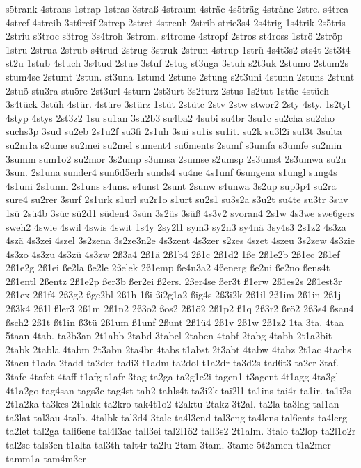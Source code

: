 {s5trank
4strans
1strap
1stras
3straß
4straum
4sträc
4s5träg
4sträne
2stre.
s4trea
4stref
4streib
3st6reif
2strep
2stret
4streuh
2strib
strie3s4
2s4trig
1s4trik
2s5tris
2striu
s3troc
s3trog
3s4troh
3strom.
s4trome
4stropf
2stros
st4ross
1strö
2ströp
1stru
2strua
2strub
s4trud
2strug
3struk
2strun
4strup
1strü
4s4t3s2
sts4t
2st3t4
st2u
1stub
4stuch
3s4tud
2stue
3stuf
2stug
st3uga
3stuh
s2t3uk
2stumo
2stum2s
stum4sc
2stumt
2stun.
st3una
1stund
2stune
2stung
s2t3uni
4stunn
2stuns
2stunt
2stuö
stu3ra
stu5re
2st3url
4sturn
2st3urt
3s2turz
2stus
1s2tut
1stüc
4stüch
3s4tück
3stüh
4stür.
4stüre
3stürz
1stüt
2stütc
2stv
2stw
stwor2
2sty
4sty.
1s2tyl
4styp
4stys
2st3z2
1su
su1an
3su2b3
su4ba2
4subi
su4br
3su1c
su2cha
su2cho
suchs3p
3sud
su2eb
2s1u2f
su3fi
2s1uh
3sui
su1is
su1it.
su2k
su3l2i
sul3t
3sulta
su2m1a
s2ume
su2mei
su2mel
sument4
su6ments
2sumf
s3umfa
s3umfe
su2min
3summ
sum1o2
su2mor
3s2ump
s3umsa
2sumse
s2umsp
2s3umst
2s3umwa
su2n
3sun.
2s1una
sunder4
sun6d5erh
sunds4
su4ne
4s1unf
6sungena
s1ungl
sung4s
4s1uni
2s1unm
2s1uns
s4uns.
s4unst
2sunt
2sunw
s4unwa
3s2up
sup3p4
su2ra
sure4
su2rer
3surf
2s1urk
s1url
su2r1o
s1urt
su2s1
su3s2a
s3u2t
su4te
su3tr
3suv
1sü
2sü4b
3süc
sü2d1
süden4
3sün
3s2üs
3süß
4s3v2
svoran4
2s1w
4s3we
swe6gers
sweh2
4swie
4swil
4swis
4swit
1s4y
2sy2l1
sym3
sy2n3
sy4nä
3sy4s3
2s1z2
4s3za
4szä
4s3zei
4szel
3s2zena
3s2ze3n2e
4s3zent
4s3zer
s2zes
4szet
4szeu
3s2zew
4s3zie
4s3zo
4s3zu
4s3zü
4s3zw
2ß3a4
2ß1ä
2ß1b4
2ß1c
2ß1d2
1ße
2ß1e2b
2ß1ec
2ß1ef
2ß1e2g
2ß1ei
ße2la
ße2le
2ßelek
2ß1emp
ße4n3a2
4ßenerg
ße2ni
ße2no
ßens4t
2ß1entl
2ßentz
2ß1e2p
ßer3b
ßer2ei
ß2ers.
2ßer4se
ßer3t
ß1erw
2ß1es2s
2ß1est3r
2ß1ex
2ß1f4
2ß3g2
ßge2bl
2ß1h
1ßi
ßi2g1a2
ßig4s
2ß3i2k
2ß1il
2ß1im
2ß1in
2ß1j
2ß3k4
2ß1l
ßler3
2ß1m
2ß1n2
2ß3o2
ßos2
2ß1ö2
2ß1p2
ß1q
2ß3r2
ßrö2
2ß3s4
ßsau4
ßsch2
2ß1t
ßt1in
ß3tü
2ß1um
ß1unf
2ßunt
2ß1ü4
2ß1v
2ß1w
2ß1z2
1ta
3ta.
4taa
5taan
4tab.
ta2b3an
2t1abb
2tabd
3tabel
2taben
4tabf
2tabg
4tabh
2t1a2bit
2tabk
2tabla
4tabm
2t3abn
2ta4br
4tabs
t1abst
2t3abt
4tabw
4tabz
2t1ac
4tachs
3tacu
t1ada
2tadd
ta2der
tadi3
t1adm
ta2dol
t1a2dr
ta3d2s
tad6t3
ta2er
3taf.
3tafe
4tafet
4taff
t1afg
t1afr
3tag
ta2ga
ta2g1e2i
tagen1
t3agent
4t1agg
4ta3gl
4t1a2go
tag4san
tags3c
tag4st
tah2
tahls4t
ta3i2k
tai2l1
ta1ins
tai4r
ta1ir.
ta1i2s
2t1a2ka
ta3kes
2t1akk
ta2kro
tak4t1o2
t2aktu
2takz
3t2al.
ta2la
ta3lag
tal1an
ta3lat
tal3au
4talb.
4talbk
tal3d4
3tale
ta4l3end
tal3eng
ta4lens
tal6ents
ta4lerg
ta2let
tal2ga
tali6ene
tal4l3ac
tall3ei
tal2l1ö2
tall3s2
2t1alm.
3talo
ta2lop
ta2l1o2r
tal2se
tals3en
t1alta
tal3th
talt4r
ta2lu
2tam
3tam.
3tame
5t2amen
t1a2mer
tamm1a
tam4m3er
}
